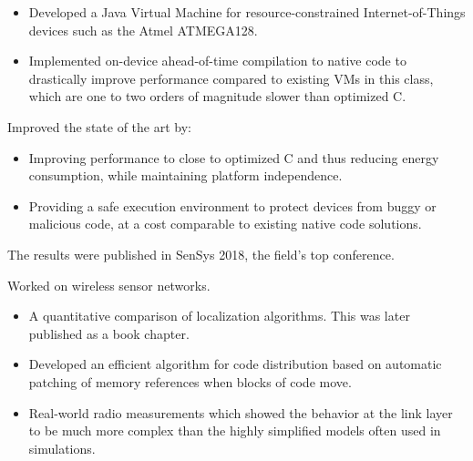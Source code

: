 \documentclass[10pt,a4paper]{../altacv}
\begin{document}
\medskip


\medskip


\medskip

\begin{itemize}
	\item Developed a Java Virtual Machine for resource-constrained Internet-of-Things devices such as the Atmel ATMEGA128.
	\item Implemented on-device ahead-of-time compilation to native code to drastically improve performance compared to existing VMs in this class, which are one to two orders of magnitude slower than optimized C.
\end{itemize}

\medskip

Improved the state of the art by:

\medskip

\begin{itemize}
	\item Improving performance to close to optimized C and thus reducing energy consumption, while maintaining platform independence.
	\item Providing a safe execution environment to protect devices from buggy or malicious code, at a cost comparable to existing native code solutions.
\end{itemize}

\medskip

The results were published in SenSys 2018, the field's top conference.

\medskip




\medskip\medskip{}

Worked on wireless sensor networks.

\medskip

\begin{itemize}
	\item\small A quantitative comparison of localization algorithms. This was later published as a book chapter.
	\item\small Developed an efficient algorithm for code distribution based on automatic patching of memory references when blocks of code move.
	\item\small Real-world radio measurements which showed the behavior at the link layer to be much more complex than the highly simplified models often used in simulations.
\end{itemize}
\end{document}
